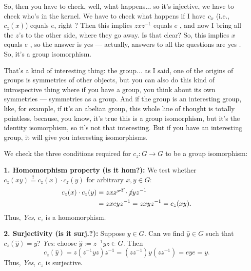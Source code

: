 \begin{proofWrapper}
\begin{speech}[00:21:30 - 00:23:12]
So, then you have to check, well, what happens... so it's injective, we have to check who's in the kernel. We have to check what happens if I have $c_x$ (i.e., $c_z(x)$) equals $e$, right ? Then this implies $z x z^{-1}$ equals $e$ , and now I bring all the $z$'s to the other side, where they go away. Is that clear? So, this implies $x$ equals $e$ , so the answer is yes --- actually, answers to all the questions are yes . So, it's a group isomorphism.

That's a kind of interesting thing: the group... as I said, one of the origins of groups is symmetries of other objects, but you can also do this kind of introspective thing where if you have a group, you think about its own symmetries --- symmetries as a group. And if the group is an interesting group, like, for example, if it's an abelian group, this whole line of thought is totally pointless, because, you know, it's true this is a group isomorphism, but it's the identity isomorphism, so it's not that interesting. But if you have an interesting group, it will give you interesting isomorphisms.
\end{speech}

\begin{content}
We check the three conditions required for $c_z \colon G \to G$ to be a group isomorphism:

\textbf{1. Homomorphism property (is it hom?):} We test whether $c_z(xy) \stackrel{?}{=} c_z(x) \cdot c_z(y)$ for arbitrary $x, y \in G$:
\begin{align}
c_z(x) \cdot c_z(y) &= z x \cancel{z^{-1}} \cdot \cancel{z} y z^{-1} \nonumber \\
&= z x e y z^{-1} = z x y z^{-1} = c_z(xy). \label{eq:cz-hom}
\end{align}
Thus, \emph{Yes}, $c_z$ is a homomorphism.

\textbf{2. Surjectivity (is it surj.?):} Suppose $y \in G$. Can we find $\hat{y} \in G$ such that $c_z(\hat{y}) = y$? \emph{Yes}: choose $\hat{y} := z^{-1} y z \in G$. Then
\begin{equation}\label{eq:cz-surj}
c_z(\hat{y}) = z (z^{-1} y z) z^{-1} = (z z^{-1}) y (z z^{-1}) = e y e = y.
\end{equation}
Thus, \emph{Yes}, $c_z$ is surjective.


\end{content}
\end{proofWrapper}
